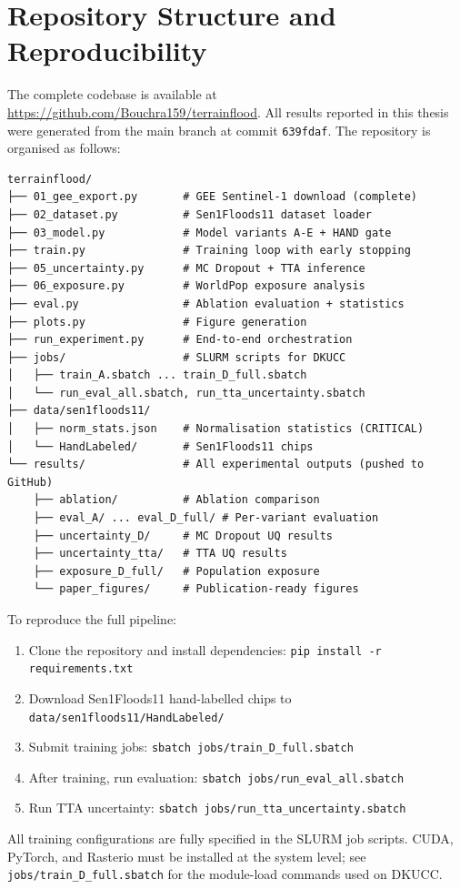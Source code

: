 \documentclass[12pt,oneside]{report}
\begin{document}
\chapter{Repository Structure and Reproducibility}
\label{app:repo}

The complete codebase is available at
\url{https://github.com/Bouchra159/terrainflood}.
All results reported in this thesis were generated from the main branch at
commit \texttt{639fdaf}.
The repository is organised as follows:

\begin{verbatim}
terrainflood/
├── 01_gee_export.py       # GEE Sentinel-1 download (complete)
├── 02_dataset.py          # Sen1Floods11 dataset loader
├── 03_model.py            # Model variants A-E + HAND gate
├── train.py               # Training loop with early stopping
├── 05_uncertainty.py      # MC Dropout + TTA inference
├── 06_exposure.py         # WorldPop exposure analysis
├── eval.py                # Ablation evaluation + statistics
├── plots.py               # Figure generation
├── run_experiment.py      # End-to-end orchestration
├── jobs/                  # SLURM scripts for DKUCC
│   ├── train_A.sbatch ... train_D_full.sbatch
│   └── run_eval_all.sbatch, run_tta_uncertainty.sbatch
├── data/sen1floods11/
│   ├── norm_stats.json    # Normalisation statistics (CRITICAL)
│   └── HandLabeled/       # Sen1Floods11 chips
└── results/               # All experimental outputs (pushed to GitHub)
    ├── ablation/          # Ablation comparison
    ├── eval_A/ ... eval_D_full/ # Per-variant evaluation
    ├── uncertainty_D/     # MC Dropout UQ results
    ├── uncertainty_tta/   # TTA UQ results
    ├── exposure_D_full/   # Population exposure
    └── paper_figures/     # Publication-ready figures
\end{verbatim}

To reproduce the full pipeline:
\begin{enumerate}
  \item Clone the repository and install dependencies:
        \texttt{pip install -r requirements.txt}
  \item Download Sen1Floods11 hand-labelled chips to
        \texttt{data/sen1floods11/HandLabeled/}
  \item Submit training jobs:
        \texttt{sbatch jobs/train\_D\_full.sbatch}
  \item After training, run evaluation:
        \texttt{sbatch jobs/run\_eval\_all.sbatch}
  \item Run TTA uncertainty:
        \texttt{sbatch jobs/run\_tta\_uncertainty.sbatch}
\end{enumerate}

All training configurations are fully specified in the SLURM job scripts.
CUDA, PyTorch, and Rasterio must be installed at the system level;
see \texttt{jobs/train\_D\_full.sbatch} for the module-load commands used on
DKUCC.
\end{document}
